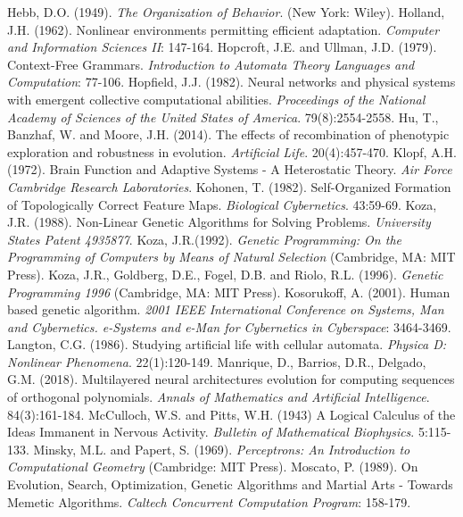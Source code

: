 \documentclass[spanish,a4paper,12pt,twoside]{report}
\begin{document}
\begin{thebibliography}{00}
   Hebb, D.O. (1949). \emph{The Organization of Behavior}. (New York: Wiley).
   Holland, J.H. (1962). Nonlinear environments permitting efficient adaptation. \emph{Computer and Information Sciences II}: 147-164.
   Hopcroft, J.E. and Ullman, J.D. (1979). Context-Free Grammars. \emph{Introduction to Automata Theory Languages and Computation}: 77-106.
   Hopfield, J.J. (1982). Neural networks and physical systems with emergent collective computational abilities. \emph{Proceedings of the National Academy of Sciences of the United States of America}. 79(8):2554-2558.
   Hu, T., Banzhaf, W. and Moore, J.H. (2014). The effects of recombination of phenotypic exploration and robustness in evolution. \emph{Artificial Life}. 20(4):457-470.
   Klopf, A.H. (1972). Brain Function and Adaptive Systems - A Heterostatic Theory. \emph{Air Force Cambridge Research Laboratories}.
   Kohonen, T. (1982). Self-Organized Formation of Topologically Correct Feature Maps. \emph{Biological Cybernetics}. 43:59-69.
   Koza, J.R. (1988). Non-Linear Genetic Algorithms for Solving Problems. \emph{University States Patent 4935877}.
   Koza, J.R.(1992). \emph{Genetic Programming: On the Programming of Computers by Means of Natural Selection}  (Cambridge, MA: MIT Press).
   Koza, J.R., Goldberg, D.E., Fogel, D.B. and Riolo, R.L. (1996). \emph{Genetic Programming 1996} (Cambridge, MA: MIT Press).
   Kosorukoff, A. (2001). Human based genetic algorithm. \emph{2001 IEEE International Conference on Systems, Man and Cybernetics. e-Systems and e-Man for Cybernetics in Cyberspace}: 3464-3469.
   Langton, C.G. (1986). Studying artificial life with cellular automata. \emph{Physica D: Nonlinear Phenomena}. 22(1):120-149.
   Manrique, D., Barrios, D.R., Delgado, G.M. (2018). Multilayered neural architectures evolution for computing sequences of orthogonal polynomials. \emph{Annals of Mathematics and Artificial Intelligence}. 84(3):161-184.
   McCulloch, W.S. and Pitts, W.H. (1943) A Logical Calculus of the Ideas Immanent in Nervous Activity. \emph{Bulletin of Mathematical Biophysics}. 5:115-133.
   Minsky, M.L. and Papert, S. (1969). \emph{Perceptrons: An Introduction to Computational Geometry} (Cambridge: MIT Press).
   Moscato, P. (1989). On Evolution, Search, Optimization, Genetic Algorithms and Martial Arts - Towards Memetic Algorithms. \emph{Caltech Concurrent Computation Program}: 158-179.

\end{thebibliography}
\end{document}
